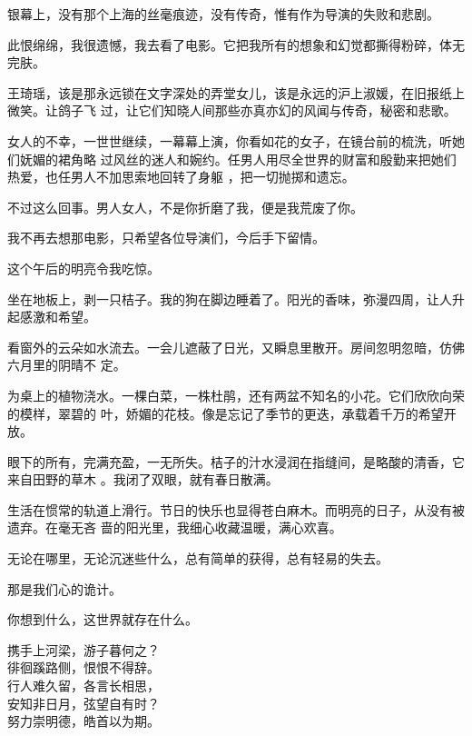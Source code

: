 \documentclass[12pt,a4paper]{article}
\begin{document}
		银幕上，没有那个上海的丝毫痕迹，没有传奇，惟有作为导演的失败和悲剧。

		此恨绵绵，我很遗憾，我去看了电影。它把我所有的想象和幻觉都撕得粉碎，体无完肤。


		王琦瑶，该是那永远锁在文字深处的弄堂女儿，该是永远的沪上淑媛，在旧报纸上微笑。让鸽子飞
	过，让它们知晓人间那些亦真亦幻的风闻与传奇，秘密和悲歌。

		女人的不幸，一世世继续，一幕幕上演，你看如花的女子，在镜台前的梳洗，听她们妩媚的裙角略
	过风丝的迷人和婉约。任男人用尽全世界的财富和殷勤来把她们热爱，也任男人不加思索地回转了身躯
	，把一切抛掷和遗忘。

		不过这么回事。男人女人，不是你折磨了我，便是我荒废了你。

		我不再去想那电影，只希望各位导演们，今后手下留情。

	\endwriting



		这个午后的明亮令我吃惊。

		坐在地板上，剥一只桔子。我的狗在脚边睡着了。阳光的香味，弥漫四周，让人升起感激和希望。

		看窗外的云朵如水流去。一会儿遮蔽了日光，又瞬息里散开。房间忽明忽暗，仿佛六月里的阴晴不
	定。

		为桌上的植物浇水。一棵白菜，一株杜鹃，还有两盆不知名的小花。它们欣欣向荣的模样，翠碧的
	叶，娇媚的花枝。像是忘记了季节的更迭，承载着千万的希望开放。

		眼下的所有，完满充盈，一无所失。桔子的汁水浸润在指缝间，是略酸的清香，它来自田野的草木
	。我闭了双眼，就有春日散满。

		生活在惯常的轨道上滑行。节日的快乐也显得苍白麻木。而明亮的日子，从没有被遗弃。在毫无吝
	啬的阳光里，我细心收藏温暖，满心欢喜。

		无论在哪里，无论沉迷些什么，总有简单的获得，总有轻易的失去。

		那是我们心的诡计。

		你想到什么，这世界就存在什么。

	\endwriting



		\shortpoem{}{}{}
		携手上河梁，游子暮何之？\\
		徘徊蹊路侧，恨恨不得辞。\\
		行人难久留，各言长相思，\\
		安知非日月，弦望自有时？\\
		努力崇明德，皓首以为期。\\
		\endshortpoem
\end{document}
